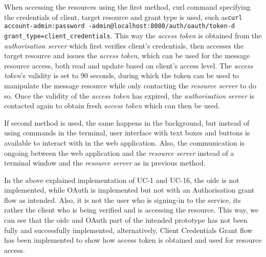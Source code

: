 When accessing the resources using the first method, \acrshort{curl} command specifying the credentials of client, target resource and grant type is used, such as\newline\texttt{curl account-admin:password -admin@localhost:8080/auth/oauth/token}\newline\texttt{-d grant\_type=client\_credentials}. This way the \textit{access token} is obtained from the \textit{authorisation server} which first verifies client's credentials, then accesses the target resource and issues the \textit{access token}, which can be used for the message resource access, both read and update based on client's access level. The \textit{access token}'s validity is set to 90 seconds, during which the token can be used to manipulate the message resource while only contacting the \textit{resource server} to do so. Once the validity of the \textit{access token} has expired, the \textit{authorisation server} is contacted again to obtain fresh \textit{access token} which can then be used.

If second method is used, the same happens in the background, but instead of using commands in the terminal, user interface with text boxes and buttons is available to interact with in the web application. Also, the communication is ongoing between the web application and the \textit{resource server} instead of a terminal window and the \textit{resource server} as in previous method.

\bigskip \noindent
In the above explained implementation of UC-1 and UC-16, the \acrshort{oidc} is not implemented, while OAuth is implemented but not with an Authorisation grant flow as intended. Also, it is not the user who is signing-in to the service, its rather the client who is being verified and is accessing the resource. This way, we can see that the \acrshort{oidc} and OAuth part of the intended prototype has not been fully and successfully implemented, alternatively, Client Credentials Grant flow has been implemented to show how access token is obtained and used for resource access.